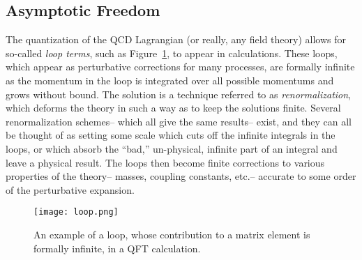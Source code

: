 \subsection{Asymptotic Freedom}
\label{chapter:sm:qcd:freedom}
The quantization of the QCD Lagrangian (or really, any field theory) allows for so-called \textit{loop terms}, such as Figure~\ref{fig:sm:loop}, to appear in calculations. These loops, which appear as perturbative corrections for many processes, are formally infinite as the momentum in the loop is integrated over all possible momentums and grows without bound. The solution is a technique referred to as \textit{renormalization}, which deforms the theory in such a way as to keep the solutions finite. Several renormalization schemes-- which all give the same results-- exist, and they can all be thought of as setting some scale which cuts off the infinite integrals in the loops, or which absorb the ``bad,'' un-physical, infinite part of an integral and leave a physical result. The loops then become finite corrections to various properties of the theory-- masses, coupling constants, etc.-- accurate to some order of the perturbative expansion.


\begin{figure}
\centering
\texttt{[image: loop.png]}
\label{fig:sm:loop}
\caption{An example of a loop, whose contribution to a matrix element is formally infinite, in a QFT calculation.}
\end{figure}


